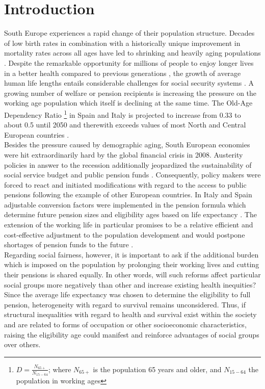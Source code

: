\documentclass[a4paper,10pt,oneside,english]{article}
\begin{document}
\section*{\textsf{Introduction}}
South Europe experiences a rapid change of their population structure. Decades of low birth rates in combination with a historically unique improvement in mortality rates across all ages have led to shrinking and heavily aging populations \citep{RN19,RN69}. Despite the remarkable opportunity for millions of people to enjoy longer lives in a better health compared to previous generations \cite{christensen2009ageing,RN14}, the growth of average human life lengths entails considerable challenges for social security systems \citep{RN68}. A growing number of welfare or pension recipients is increasing the pressure on the working age population which itself is declining at the same time. The Old-Age Dependency Ratio \footnote{\textsf{$D=\frac{N_{65+}}{N_{15-64}}$; where $N_{65+}$ is the population 65 years and older, and $N_{15-64}$ the population in working ages}} in Spain and Italy is projected to increase from 0.33 to about 0.5 until 2050 and therewith exceeds values of most North and Central European countries \citep{RN9,RN34}.\\ %
Besides the pressure caused by demographic aging, South European economies were hit extraordinarily hard by the global financial crisis in 2008. Austerity policies in answer to the recession additionally jeopardized the sustainability of social service budget and public pension funds \cite{RN64,RN141}. Consequently, policy makers were forced to react and initiated modifications with regard to the access to public pensions following the example of other European countries. In Italy and Spain adjustable conversion factors were implemented in the pension formula which determine future pension sizes and eligibility ages based on life expectancy \cite{Sanchez2014,de2014altered}. The extension of the working life in particular promises to be a relative efficient and cost-effective adjustment to the population development and would postpone shortages of pension funds to the future \citep{RN61,RN65}.\\ %
Regarding social fairness, however, it is important to ask if the additional burden which is imposed on the population by prolonging their working lives and cutting their pensions is shared equally. In other words, will such reforms affect particular social groups more negatively than other and increase existing health inequities? Since the average life expectancy was chosen to determine the eligibility to full pension, heterogeneity with regard to survival remains unconsidered. Thus, if structural inequalities with regard to health and survival exist within the society and are related to forms of occupation or other socioeconomic characteristics, raising the eligibility age could manifest and reinforce advantages of social groups over others.\\
\end{document}
